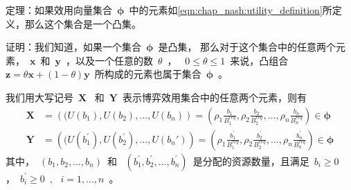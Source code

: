 定理：如果效用向量集合~$\mathbf{\phi}$~中的元素如\eqref{eqn:chap_nash:utility_definition}所定义，那么这个集合是一个凸集。

证明：我们知道，如果一个集合~$\mathbf{\phi}$~是凸集，
那么对于这个集合中的任意两个元素，~$\mathbf{x}$~和~$\mathbf{y}$~，以及一个任意的数~$\theta$~， ~$0\le \theta\le 1$~来说，凸组合~$\mathbf{z}=\theta \mathbf{x} + (1-\theta) \mathbf{y}$~所构成的元素也属于集合~$\mathbf{\phi}$~。

我们用大写记号~$\mathbf{X}$~ 和~$\mathbf{Y}$~表示博弈效用集合中的任意两个元素，则有
\begin{align*}
    \mathbf{X} &=\left( (U(b_1), U(b_2), \ldots, U(b_n) \right)
    = \left( \rho_1 \frac{b_1}{B_1^{req}},\rho_2 \frac{b_2}{B_2^{req}},\ldots, \rho_n \frac{b_n}{B_n^{req}} \right) \in \mathbf{\phi} \\
    \mathbf{Y} &=\left( (U(b_1^\prime), U(b_2^\prime), \ldots, U(b_n\prime) \right)
    = \left( \rho_1 \frac{b_1^\prime}{B_1^{req}},\rho_2 \frac{b_2^\prime}{B_2^{req}},\ldots, \rho_n \frac{b_n^\prime}{B_n^{req}} \right) \in \mathbf{\phi} 
\end{align*}
其中，~$(b_1, b_2, \ldots, b_n)$~和 ~$(b_1^\prime, b_2^\prime, \ldots, b_n^\prime)$~是分配的资源数量，且满足~$b_i \ge 0$~ ，~$b_i^\prime \ge 0$~, ~$i = 1, \ldots, n$~。

